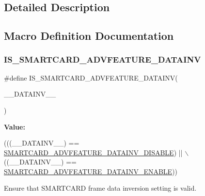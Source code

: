 \subsection{Detailed Description}


\subsection{Macro Definition Documentation}
\mbox{\label{group___s_m_a_r_t_c_a_r_d___private___macros_gaeb50799eed0020c43efd54da9ee6b5f2}} 
\subsubsection{\texorpdfstring{I\+S\+\_\+\+S\+M\+A\+R\+T\+C\+A\+R\+D\+\_\+\+A\+D\+V\+F\+E\+A\+T\+U\+R\+E\+\_\+\+D\+A\+T\+A\+I\+NV}{IS\_SMARTCARD\_ADVFEATURE\_DATAINV}}
{\footnotesize\ttfamily \#define I\+S\+\_\+\+S\+M\+A\+R\+T\+C\+A\+R\+D\+\_\+\+A\+D\+V\+F\+E\+A\+T\+U\+R\+E\+\_\+\+D\+A\+T\+A\+I\+NV(\begin{DoxyParamCaption}\item[{}]{\+\_\+\+\_\+\+D\+A\+T\+A\+I\+N\+V\+\_\+\+\_\+ }\end{DoxyParamCaption})}

{\bfseries Value\+:}
\begin{DoxyCode}
(((\_\_DATAINV\_\_) == \hyperlink{group___s_m_a_r_t_c_a_r_d___data___inv_gac4fb6665aa603acf69b00633d4eaad87}{SMARTCARD\_ADVFEATURE\_DATAINV\_DISABLE}) || \(\backslash\)
                                                      ((\_\_DATAINV\_\_) == 
      \hyperlink{group___s_m_a_r_t_c_a_r_d___data___inv_gaf6887f971ce2b5b621f8f6a09e3d0476}{SMARTCARD\_ADVFEATURE\_DATAINV\_ENABLE}))
\end{DoxyCode}


Ensure that S\+M\+A\+R\+T\+C\+A\+RD frame data inversion setting is valid. 


